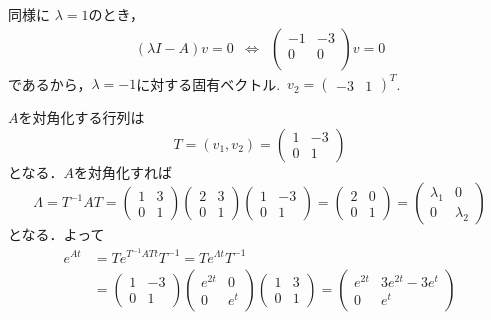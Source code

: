 \documentclass[a4paper,11pt,fleqn]{jreport}
\begin{document}
同様に
$\lambda = 1$のとき，
\[
 \begin{array}{ccc}
 (\lambda I - A) v = 0
 &\Leftrightarrow&
 \left(
 \begin{array}{cc}
  -1 & -3 \\
  0 & 0 \\
 \end{array}
 \right) v = 0 
 \end{array}
\]
であるから，$\lambda = -1$に対する固有ベクトル.\
$v_2 = (\begin{array}{cc}-3 & 1\end{array})^T$.

$A$を対角化する行列は
\[
 T=(v_1, v_2)
  =
 \left(
 \begin{array}{cc}
  1 & -3 \\
  0 & 1
 \end{array}
 \right)
\]
となる．$A$を対角化すれば
\[
 \Lambda = T^{-1}AT =
 \left(
 \begin{array}{cc}
  1 & 3 \\
  0 & 1
 \end{array}
 \right)
 \left(
 \begin{array}{cc}
  2 & 3 \\
  0 & 1
 \end{array}
 \right)
 \left(
 \begin{array}{cc}
  1 & -3 \\
  0 & 1
 \end{array}
 \right) =
 \left(
 \begin{array}{cc}
  2 & 0 \\
  0 & 1
 \end{array}
 \right) = 
 \left(
 \begin{array}{cc}
  \lambda_1 & 0 \\
  0 & \lambda_2
 \end{array}
 \right)
\]
となる．よって
\begin{align*}
 e^{At} &= T e^{T^{-1}AT t} T^{-1}
 = T e^{\Lambda t} T^{-1}
\\
 &=
 \left(
 \begin{array}{cc}
  1 & -3 \\
  0 & 1
 \end{array}
 \right)
 \left(
 \begin{array}{cc}
  e^{2t} & 0 \\
  0 & e^{t}
 \end{array}
 \right)
 \left(
 \begin{array}{cc}
  1 & 3 \\
  0 & 1
 \end{array}
 \right)
 =
 \left(
 \begin{array}{cc}
  e^{2t} & 3 e^{2t} - 3 e^{t} \\
  0 & e^{t}
 \end{array}
 \right)
\end{align*}
\end{document}
